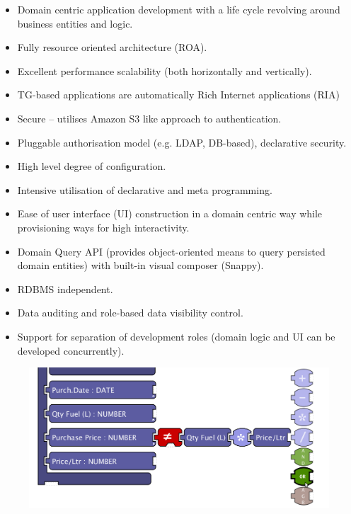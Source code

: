 \documentclass[a4paper,12pt,twocolumn]{article}
\begin{document}
  \begin{itemize}
    \item Domain centric application development with a life cycle revolving around business entities and logic.
    \item Fully resource oriented architecture (ROA).
    \item Excellent performance scalability (both horizontally and vertically).
    \item TG-based applications are automatically Rich Internet applications (RIA)
    \item Secure -- utilises Amazon S3 like approach to authentication.
    \item Pluggable authorisation model (e.g. LDAP, DB-based), declarative security.
    \item High level degree of configuration.
    \item Intensive utilisation of declarative and meta programming.    
    \item Ease of user interface (UI) construction in a domain centric way while provisioning ways for high interactivity.
    \item Domain Query API (provides object-oriented means to query persisted domain entities) with built-in visual composer (Snappy).
    \item RDBMS independent.
    \item Data auditing and role-based data visibility control.
    \item Support for separation of development roles (domain logic and UI can be developed concurrently).
  \end{itemize}

  \begin{figure}[!h]
  \centering
  \includegraphics[scale=0.22]{images/01-rulesarea-suggestionmenu.png}  
  \end{figure}
\end{document}
